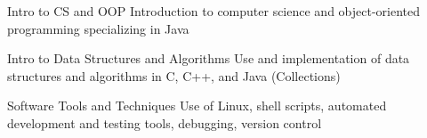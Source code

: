 

\begin{cvskills}

  \cvskill
    {Intro to CS and OOP} %
    {Introduction to computer science and object-oriented programming specializing in Java} %

  \cvskill
    {Intro to Data Structures and Algorithms} %
    {Use and implementation of data structures and algorithms in C, C++, and Java (Collections)} %
    
  \cvskill
    {Software Tools and Techniques} %
    {Use of Linux, shell scripts, automated development and testing tools, debugging, version control} %


\end{cvskills}
